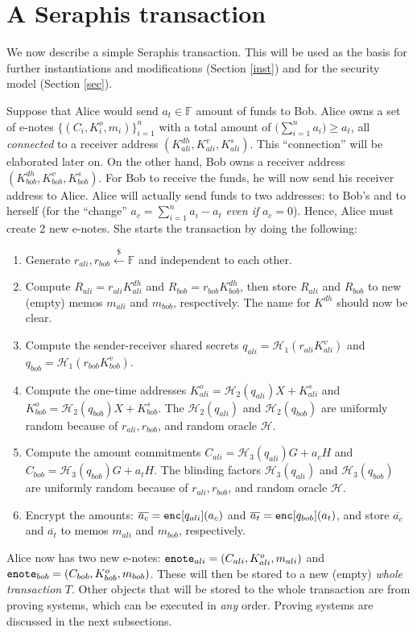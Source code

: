 \documentclass{article}
\begin{document}
\section{A Seraphis transaction}\label{ser-tx}
We now describe a simple Seraphis transaction. This will be used as the basis for further instantiations and modifications (Section \ref{inst}) and for the security model (Section \ref{sec}).

Suppose that Alice would send $a_t\in\mathbb{F}$ amount of funds to Bob. Alice owns a set of e-notes $\{(C_i,K_i^o,m_i)\}_{i=1}^n$ with a total amount of $\big(\sum_{i=1}^{n}{a_i}\big)\ge a_t$, all \textit{connected} to a receiver address $(K_{ali}^{dh}, K_{ali}^v, K_{ali}^s)$. This ``connection'' will be elaborated later on. On the other hand, Bob owns a receiver address $(K_{bob}^{dh}, K_{bob}^v, K_{bob}^s)$. For Bob to receive the funds, he will now send his receiver address to Alice. Alice will actually send funds to two addresses: to Bob's and to herself (for the ``change'' $a_{c} = \sum_{i=1}^{n}{a_i} - a_t$ \textit{even if} $a_{c}=0$). Hence, Alice must create 2 new e-notes. She starts the transaction by doing the following:
\begin{enumerate}
    \item Generate $r_{ali}, r_{bob}\xleftarrow{\$}\mathbb{F}$ and independent to each other.
    \item Compute $R_{ali} = r_{ali}K_{ali}^{dh}$ and $R_{bob} = r_{bob}K_{bob}^{dh}$, then store $R_{ali}$ and $R_{bob}$ to new (empty) memos $m_{ali}$ and $m_{bob}$, respectively. The name for $K^{dh}$ should now be clear.
    \item Compute the sender-receiver shared secrets $q_{ali} = \mathcal{H}_1(r_{ali}K_{ali}^{v})$ and $q_{bob} = \mathcal{H}_1(r_{bob}K_{bob}^{v})$.
    \item Compute the one-time addresses $K_{ali}^o = \mathcal{H}_2(q_{ali})X + K_{ali}^s$ and $K_{bob}^o = \mathcal{H}_2(q_{bob})X + K_{bob}^s$. The $\mathcal{H}_2(q_{ali})$ and $\mathcal{H}_2(q_{bob})$ are uniformly random because of $r_{ali}, r_{bob}$, and random oracle $\mathcal{H}$.
    \item Compute the amount commitments $C_{ali} = \mathcal{H}_3(q_{ali})G + a_c H$ and $C_{bob} = \mathcal{H}_3(q_{bob})G + a_t H$. The blinding factors $\mathcal{H}_3(q_{ali})$ and $\mathcal{H}_3(q_{bob})$ are uniformly random because of $r_{ali}, r_{bob}$, and random oracle $\mathcal{H}$.
    \item Encrypt the amounts: $\overline{a_c} = {\tt enc}[q_{ali}](a_c)$ and $\overline{a_t} = {\tt enc}[q_{bob}](a_t)$, and store $\overline{a_c}$ and $\overline{a_t}$ to memos $m_{ali}$ and $m_{bob}$, respectively.
\end{enumerate}
Alice now has two new e-notes: ${\tt enote}_{ali} = (C_{ali}, K_{ali}^o, m_{ali})$ and ${\tt enote}_{bob} = (C_{bob}, K_{bob}^o, m_{bob})$. These will then be stored to a new (empty) \textit{whole transaction} $T$. Other objects that will be stored to the whole transaction are from proving systems, which can be executed in \textit{any} order. Proving systems are discussed in the next subsections.
\end{document}
